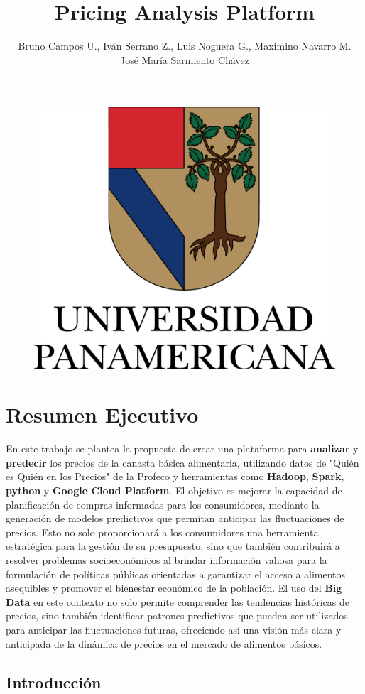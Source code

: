\documentclass{article}
\title{\textbf{Pricing Analysis Platform}}
\author{Bruno Campos U., Iván Serrano Z., Luis Noguera G., Maximino Navarro M. 
\\ José María Sarmiento Chávez}
\affil[]{Universidad Panamericana 
\\Maestría en Ciencia de Datos}
\begin{document}
\begin{figure}
\includegraphics[width=0.4\linewidth]{Reports/images/up_logo.jpg}
\end{figure}

\maketitle

\section{Resumen Ejecutivo}

En este trabajo se plantea la propuesta de crear una plataforma para \textbf{analizar} y \textbf{predecir} los precios de la canasta básica alimentaria, utilizando datos de "Quién es Quién en los Precios" de la Profeco y herramientas como \textbf{Hadoop}, \textbf{Spark}, \textbf{python} y \textbf{Google Cloud Platform}. El objetivo es mejorar la capacidad de planificación de compras informadas para los consumidores, mediante la generación de modelos predictivos que permitan anticipar las fluctuaciones de precios. Esto no solo proporcionará a los consumidores una herramienta estratégica para la gestión de su presupuesto, sino que también contribuirá a resolver problemas socioeconómicos al brindar información valiosa para la formulación de políticas públicas orientadas a garantizar el acceso a alimentos asequibles y promover el bienestar económico de la población. El uso del \textbf{Big Data} en este contexto no solo permite comprender las tendencias históricas de precios, sino también identificar patrones predictivos que pueden ser utilizados para anticipar las fluctuaciones futuras, ofreciendo así una visión más clara y anticipada de la dinámica de precios en el mercado de alimentos básicos.

\subsection{Introducción}
\end{document}
